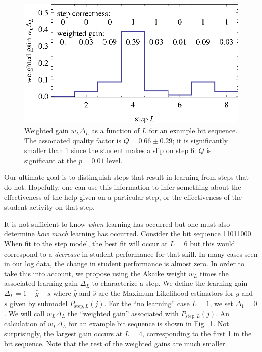 \documentclass{edm_template}
\begin{document}
\begin{figure}
  \centering \includegraphics{weighted-gains.eps}
   \caption{Weighted gain $w_L\Delta_L$ as a function of $L$ for an example bit sequence.
    The associated quality factor is $Q=0.66\pm0.29$;  it is
     significantly smaller than 1 since the student makes
     a slip on step 6.  $Q$ is significant at the $p=0.01$ level.}
    \label{weighted-gain-example}
\end{figure}

Our ultimate goal is to distinguish steps that result in 
learning from steps that do not.  Hopefully, one can use this
information to infer something about the effectiveness of the help
given on a particular step, or the effectiveness of
the student activity on that step.

It is not sufficient to know {\it when} learning has occurred but one
must also determine {\it how much} learning has occurred.  Consider
the bit sequence 11011000.  When fit to the step model, the best fit
will occur at $L=6$ but this would correspond to a {\it decrease} in student
performance for that skill.  In many cases seen in our log data, 
the change in student performance is almost zero.  In order to take 
this into account,
we propose using the Akaike weight $w_L$ times the associated learning
gain $\Delta_L$ to characterize a step.  We define the learning gain
$\Delta_L=1-\hat{g}-\hat{s}$ where $\hat{g}$ and $\hat{s}$ are the
Maximum Likelihood estimators for $g$ and $s$ given by submodel
$P_{\mathrm{step},L}(j)$.  For the ``no learning'' case $L=1$, we set
$\Delta_1=0$.  We will call $w_L \Delta_L$ the ``weighted gain''
associated with $P_{\mathrm{step},L}(j)$.
An calculation of $w_L \Delta_L$  for an example bit sequence is
shown in Fig.~\ref{weighted-gain-example}.  Not surprisingly, 
the largest gain occurs at $L=4$, corresponding to the first 1 in the
bit sequence.  Note that the rest of the weighted gains are much smaller.
\end{document}
